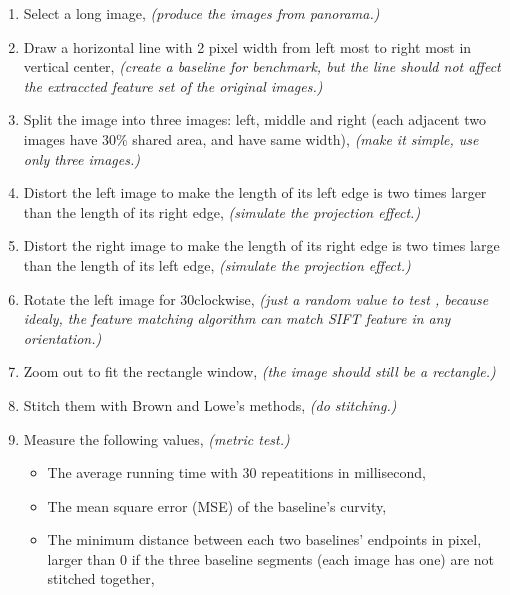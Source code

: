 \documentclass[10pt,twocolumn,letterpaper]{article}
\begin{document}
\begin{enumerate}
    \item Select a long image, \textit{(produce the images from panorama.)}
    \item Draw a horizontal line with 2 pixel width from left most to right most in vertical center, \textit{(create a baseline for benchmark, but the line should not affect the extraccted feature set of the original images.)}
    \item Split the image into three images: left, middle and right (each adjacent two images have 30\% shared area, and have same width), \textit{(make it simple, use only three images.)}
    \item Distort the left image to make the length of its left edge is two times larger than the length of its right edge, \textit{(simulate the projection effect.)}
    \item Distort the right image to make the length of its right edge is two times large than the length of its left edge, \textit{(simulate the projection effect.)}
    \item Rotate the left image for 30\degree clockwise, \textit{(just a random value to test , because idealy, the feature matching algorithm can match SIFT feature in any orientation.)}
    \item Zoom out to fit the rectangle window, \textit{(the image should still be a rectangle.)}
    \item Stitch them with Brown and Lowe's methods, \textit{(do stitching.)}
    \item Measure the following values, \textit{(metric test.)} 
    \begin{itemize}
        \item The average running time with 30 repeatitions in millisecond,
        \item The mean square error (MSE) of the baseline's curvity,
        \item The minimum distance between each two baselines' endpoints in pixel, larger than 0 if the three baseline segments (each image has one) are not stitched together,
    \end{itemize}
\end{enumerate}

\end{document}
